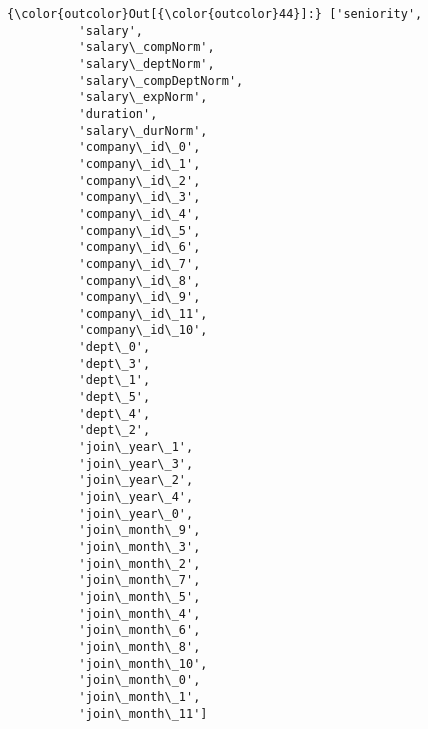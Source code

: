 \documentclass[11pt]{article}
\begin{document}
\begin{Verbatim}[commandchars=\\\{\}]
{\color{outcolor}Out[{\color{outcolor}44}]:} ['seniority',
          'salary',
          'salary\_compNorm',
          'salary\_deptNorm',
          'salary\_compDeptNorm',
          'salary\_expNorm',
          'duration',
          'salary\_durNorm',
          'company\_id\_0',
          'company\_id\_1',
          'company\_id\_2',
          'company\_id\_3',
          'company\_id\_4',
          'company\_id\_5',
          'company\_id\_6',
          'company\_id\_7',
          'company\_id\_8',
          'company\_id\_9',
          'company\_id\_11',
          'company\_id\_10',
          'dept\_0',
          'dept\_3',
          'dept\_1',
          'dept\_5',
          'dept\_4',
          'dept\_2',
          'join\_year\_1',
          'join\_year\_3',
          'join\_year\_2',
          'join\_year\_4',
          'join\_year\_0',
          'join\_month\_9',
          'join\_month\_3',
          'join\_month\_2',
          'join\_month\_7',
          'join\_month\_5',
          'join\_month\_4',
          'join\_month\_6',
          'join\_month\_8',
          'join\_month\_10',
          'join\_month\_0',
          'join\_month\_1',
          'join\_month\_11']
\end{Verbatim}
            
\end{document}
